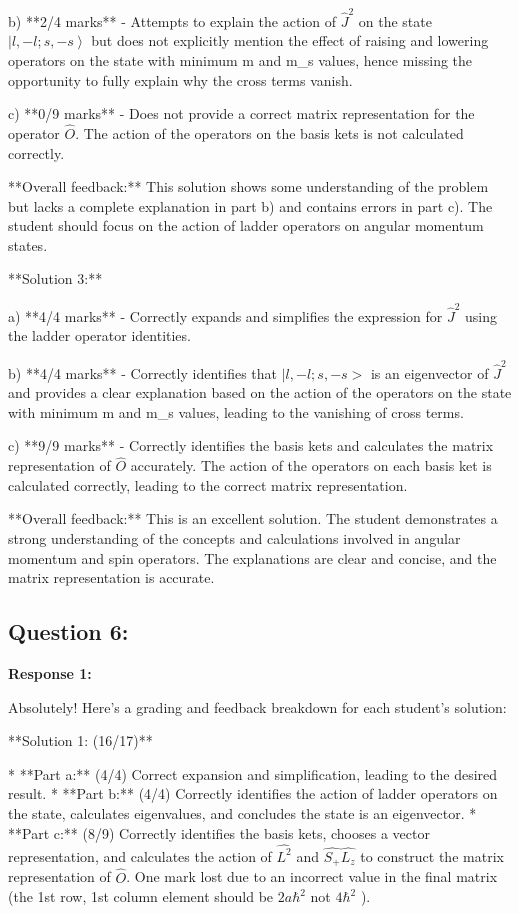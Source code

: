 \documentclass[a4paper,11pt]{article}
\begin{document}
b) **2/4 marks** - Attempts to explain the action of \(\hat{J}^2\) on the state \(\left|l, -l; s, -s \right>\) but does not explicitly mention the effect of raising and lowering operators on the state with minimum m and m_s values, hence missing the opportunity to fully explain why the cross terms vanish.

c) **0/9 marks** - Does not provide a correct matrix representation for the operator \(\hat{O}\). The action of the operators on the basis kets is not calculated correctly.

**Overall feedback:** This solution shows some understanding of the problem but lacks a complete explanation in part b) and contains errors in part c). The student should focus on the action of ladder operators on angular momentum states.

**Solution 3:**

a) **4/4 marks** - Correctly expands and simplifies the expression for \(\hat{J}^2\) using the ladder operator identities.

b) **4/4 marks** - Correctly identifies that \(|l, -l; s, -s >\) is an eigenvector of \(\hat{J}^2\) and provides a clear explanation based on the action of the operators on the state with minimum m and m_s values, leading to the vanishing of cross terms.

c) **9/9 marks** - Correctly identifies the basis kets and calculates the matrix representation of \(\hat{O}\) accurately. The action of the operators on each basis ket is calculated correctly, leading to the correct matrix representation.

**Overall feedback:** This is an excellent solution. The student demonstrates a strong understanding of the concepts and calculations involved in angular momentum and spin operators. The explanations are clear and concise, and the matrix representation is accurate.


\subsection*{Question 6:}

\textbf{Response 1:}

Absolutely! Here's a grading and feedback breakdown for each student's solution:

**Solution 1: (16/17)**

*   **Part a:** (4/4) Correct expansion and simplification, leading to the desired result.
*   **Part b:** (4/4) Correctly identifies the action of ladder operators on the state, calculates eigenvalues, and concludes the state is an eigenvector.
*   **Part c:** (8/9) Correctly identifies the basis kets, chooses a vector representation, and calculates the action of  \( \hat{L^{2}} \) and \( \hat{S_{+}} \hat{L_z} \) to construct the matrix representation of \(\hat{O}\). One mark lost due to an incorrect value in the final matrix (the 1st row, 1st column element should be \(2a\hbar^2\) not \(4\hbar^2\) ).
\end{document}
